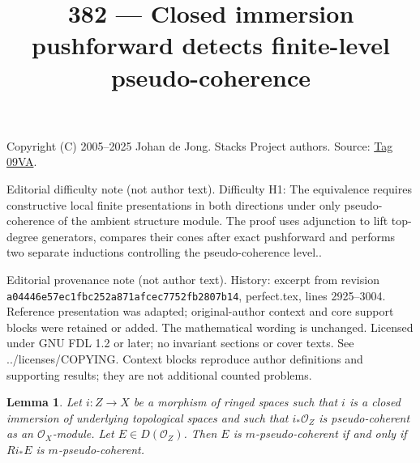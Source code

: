 \documentclass{amsart}
\theoremstyle{plain}
\newtheorem{lemma}[subsection]{Lemma}
\theoremstyle{definition}
\theoremstyle{remark}
\numberwithin{equation}{subsection}
\begin{document}
\title[Stacks Project, Tag 09VA]{382 --- Closed immersion pushforward detects finite-level pseudo-coherence}
\maketitle
\noindent Copyright (C) 2005--2025 Johan de Jong. Stacks Project authors. Source: \href{https://stacks.math.columbia.edu/tag/09VA}{Tag 09VA}.

\noindent Editorial difficulty note (not author text). Difficulty H1: The equivalence requires constructive local finite presentations in both directions under only pseudo-coherence of the ambient structure module. The proof uses adjunction to lift top-degree generators, compares their cones after exact pushforward and performs two separate inductions controlling the pseudo-coherence level..

\noindent Editorial provenance note (not author text). History: excerpt from revision \texttt{a0444\allowbreak 6e57e\allowbreak c1fbc\allowbreak 252a8\allowbreak 71afc\allowbreak ec775\allowbreak 2fb28\allowbreak 07b14}, perfect.tex, lines 2925--3004. Reference presentation was adapted; original-author context and core support blocks were retained or added. The mathematical wording is unchanged. Licensed under GNU FDL 1.2 or later; no invariant sections or cover texts. See ../licenses/COPYING. Context blocks reproduce author definitions and supporting results; they are not additional counted problems.

\begin{lemma}
\label{lemma-closed-push-pseudo-coherent}
Let $i : Z \to X$ be a morphism of ringed spaces such that
$i$ is a closed immersion of underlying topological spaces and such that
$i_*\mathcal{O}_Z$ is pseudo-coherent as an $\mathcal{O}_X$-module.
Let $E \in D(\mathcal{O}_Z)$. Then $E$ is $m$-pseudo-coherent
if and only if $Ri_*E$ is $m$-pseudo-coherent.
\end{lemma}
\end{document}
